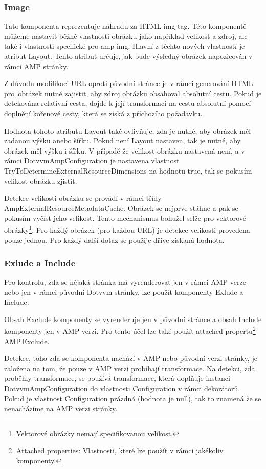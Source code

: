  \subsubsection{Image}
 Tato komponenta reprezentuje náhradu za HTML img tag. Této komponentě můžeme nastavit běžné vlastnosti obrázku jako například velikost a zdroj, ale také i vlastnosti specifické pro amp-img. Hlavní z těchto nových vlastností je atribut Layout. Tento atribut určuje, jak bude výsledný obrázek napozicován v rámci AMP stránky.
 
 Z důvodu modifikaci URL oproti původní stránce je v rámci generování HTML pro~obrázek nutné zajistit, aby zdroj obrázku obsahoval absolutní cestu. Pokud je detekována relativní cesta, dojde k její transformaci na cestu absolutní pomocí doplnění kořenové cesty, která se získá z příchozího požadavku.
 
 Hodnota tohoto atributu Layout také ovlivňuje, zda je nutné, aby obrázek měl zadanou výšku anebo šířku. Pokud není Layout nastaven, tak je nutné, aby obrázek měl výšku i šířku. V případě že velikost obrázku nastavená není, a v rámci DotvvmAmpConfiguration je nastavena vlastnost TryToDetermineExternalResourceDimensions na hodnotu true, tak se pokusím velikost obrázku zjistit.
 
 Detekce velikosti obrázku se provádí v rámci třídy AmpExternalResourceMetadataCache. Obrázek se nejprve stáhne a pak se pokusím vyčíst jeho velikost. Tento mechanismus bohužel selže pro vektorové obrázky\footnote{Vektorové obrázky nemají specifikovanou velikost.}. Pro každý obrázek (pro každou URL) je detekce velikosti provedena pouze jednou. Pro každý další dotaz se použije dříve získaná hodnota.
 
 \subsubsection{Exlude a Include}
 Pro kontrolu, zda se nějaká stránka má vyrenderovat jen v rámci AMP verze nebo jen v rámci původní Dotvvm stránky, lze použít komponenty Exlude a Include.
 
 Obsah Exclude komponenty se vyrenderuje jen v původní stránce a obsah Include komponenty jen v AMP verzi. Pro tento účel lze také použít attached propertu\footnote{Attached properties: Vlastnosti, které lze použít v rámci jakékoliv komponenty.} AMP.Exclude.
 
 Detekce, toho zda se komponenta nachází v AMP nebo původní verzi stránky, je založena na tom, že pouze v AMP verzi probíhají transformace. Na detekci, zda proběhly transformace, se používá transformace, která doplňuje instanci DotvvmAmpConfiguration do vlastnosti Configuration v rámci dekorátorů. Pokud je vlastnost Configuration prázdná (hodnota je null), tak to znamená že se nenacházíme na AMP verzi stránky.
 
